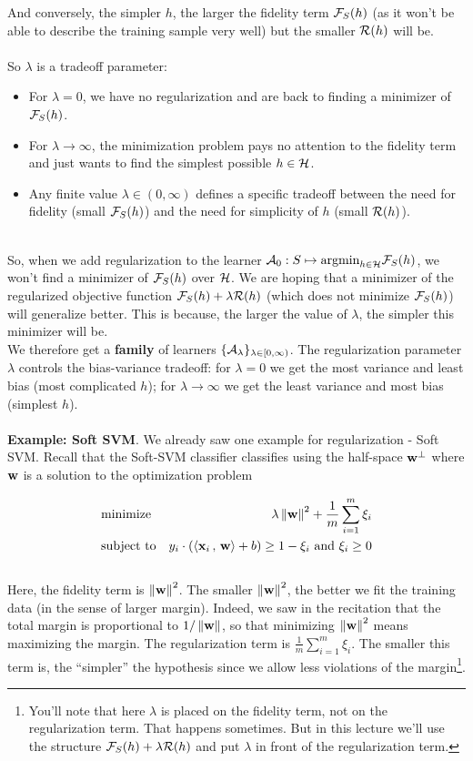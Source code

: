 And conversely, the simpler $h$, the larger the fidelity term $\mathcal{F}_S(h)$ (as it
won't be able to describe the training sample very well) but the smaller
$\mathcal{R}(h)$ will be.
\\~\\
So $\lambda$ is a tradeoff parameter:
\begin{itemize}
  \item For $\lambda=0$, we have no regularization and are back to finding a
    minimizer of $\mathcal{F}_S(h)$.
  \item For $\lambda \to\infty$, the minimization problem pays no attention to
    the fidelity term and just wants to find the simplest possible $h\in\mathcal{H}$.
  \item Any finite value $\lambda\in(0,\infty)$ defines a specific tradeoff
    between the need for fidelity (small $\mathcal{F}_S(h)$) and the need for simplicity
    of $h$ (small $\mathcal{R}(h)$).
\end{itemize}
~\\
So, when we add regularization to the learner
$\mathcal{A}_0:S\mapsto\text{argmin}_{h\in\mathcal{H}} \mathcal{F}_S(h)$, we won't find a minimizer of
$\mathcal{F}_S(h)$ over $\mathcal{H}$. We are hoping that a minimizer of the regularized
objective function $\mathcal{F}_S(h)+ \lambda \mathcal{R}(h) $ (which does not minimize
$\mathcal{F}_S(h)$) will generalize better.
This is because, the larger the value of $\lambda$, the simpler this minimizer
will be.
~\\
We therefore get a {\bf family} of learners $\{\mathcal{A}_\lambda\}_{\lambda\in[0,\infty)}$. The
regularization parameter $\lambda$ controls the bias-variance tradeoff: for
$\lambda=0$ we get the most variance and least bias (most complicated $h$); for $\lambda\to\infty$ we
get the least variance and most bias (simplest $h$).
\\~\\
{\bf Example: Soft SVM}. We already saw one example for regularization - Soft
SVM. Recall that the Soft-SVM classifier classifies using the half-space $\mathbf{w}^\perp$
where $\mathbf{w}$ is a solution to the optimization problem

\begin{eqnarray*}
      & \text{minimize}   &  \lambda \left\| \mathbf{w}\right\|^2 + \frac{1}{m}\sum_{i=1}^m
      \xi_i \\
      & \text{subject to} & y_i \cdot \left( {\left\langle \mathbf{x}_i\,,\,\mathbf{w} \right\rangle}
     +b \right) \geq 1-\xi_i  \,\,\text{and}\,\, \xi_i\geq 0 
    \end{eqnarray*}
~\\
    Here, the fidelity term is $\left\| \mathbf{w}\right\|^2$. The smaller $\left\| \mathbf{w}\right\|^2$,
    the better we fit the training data (in the sense of larger margin). 
    Indeed, we saw in the recitation that
    the total margin is proportional to $1/\left\| \mathbf{w}\right\|$, so that minimizing  $\left\| \mathbf{w}\right\|^2$
    means maximizing the margin. 
    The regularization term is  $\frac{1}{m}\sum_{i=1}^m \xi_i$. The smaller
    this term is, the ``simpler'' the hypothesis since we allow less violations
    of the margin\footnote{You'll note that here $\lambda$ is placed on the fidelity
    term, not on the regularization term. That happens sometimes. But in this
    lecture we'll use the structure $\mathcal{F}_S(h)+ \lambda \mathcal{R}(h) $ and put
  $\lambda$ in front of the regularization term.}.

